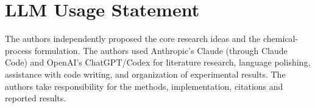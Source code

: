 \section*{LLM Usage Statement}
The authors independently proposed the core research ideas and the chemical-process formulation. The authors used Anthropic's Claude (through Claude Code) and OpenAI's ChatGPT/Codex for literature research, language polishing, assistance with code writing, and organization of experimental results. The authors take responsibility for the methods, implementation, citations and reported results.
